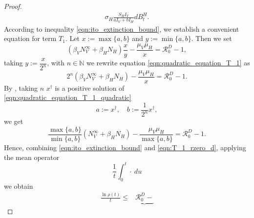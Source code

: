 \begin{proof}
\begin{equation}
\begin{aligned}
            \sigma_H
            \frac{S_H I_V}{a I_V + b I_H}
            d B_t ^ H.
        \end{aligned}
    \end{equation}
    According to inequality \eqref{eqn:ito_extinction_bound}, we establish
    a convenient equation for term $T_1$. 
    Let $x:= \max \{ a, b\}$ and $y := \min \{a,b\}$. Then we set
    \begin{equation}
        \label{eqn:quadratic_equation_T_1}
        \left (
            \beta_V
             N_V ^ \infty
            +
            \beta_H N_H
        \right )\frac{x}{y}
        -
        \frac{\mu_V \mu_H}{x} 
        = \mathcal{R}_0^D - 1,
    \end{equation}
    taking $y := \dfrac{x}{2^n}$, with $n \in \mathbb{N}$ 
     we rewrite equation
    \eqref{eqn:quadratic_equation_T_1} as
    \begin{equation}
        \label{eqn:quadratic_equation_T_1_quadratic}
        2 ^ n
        \left (
            \beta_V
             N_V ^ \infty
            +
            \beta_H N_H
        \right )
        -
        \frac{\mu_V \mu_H}{x}
        = \mathcal{R}_0^D - 1 . 
    \end{equation}
    By , 
    taking $n$ 
    $x^\dagger$ is a positive solution
    of \eqref{eqn:quadratic_equation_T_1_quadratic}
    $$
        a:= x^\dagger, \quad b:= \frac{1}{2^n} x^{\dagger},
    $$
     we get 
    \begin{equation}\label{eqn:T_1_rzero_d}
         \dfrac{
             \max\{a, b\}
         }{
             \min\{a, b\}
         }
         \left (
              N_V ^ \infty
             +
             \beta_H N_H
         \right )
         -
         \frac{
             \mu_V \mu_H 
         }{
             \max \{a, b\} 
         }
         = \mathcal{R}_0 ^ D - 1 .
    \end{equation}
    Hence, combining \eqref{eqn:ito_extinction_bound} and 
    \eqref{eqn:T_1_rzero_d},
    applying the mean operator
    $$
        \frac{1}{t} 
            \int_{0}^{t}
                \cdot \ 
            du
    $$
     we obtain
%
    \begin{equation} 
    \label{eqn:rzero_d_bound}
        \begin{aligned}
            \frac{
                \ln \rho(t)
            }{t}
            \leq &
                \underbrace{
                    \mathcal{R}_0 ^ D
                    -
}
\end{aligned}
\end{equation}
\end{proof}
